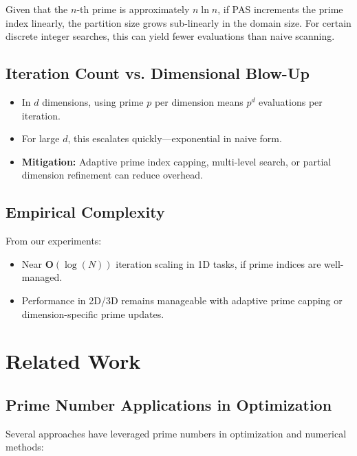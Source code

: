 \documentclass[10pt,twocolumn,letterpaper]{article}
\begin{document}
Given that the $n$-th prime is approximately $n \ln n$, if PAS increments the prime index linearly, the partition size grows sub-linearly in the domain size. For certain discrete integer searches, this can yield fewer evaluations than naive scanning.

\subsection{Iteration Count vs. Dimensional Blow-Up}

\begin{itemize}
    \item In $d$ dimensions, using prime $p$ per dimension means $p^d$ evaluations per iteration.
    \item For large $d$, this escalates quickly—exponential in naive form.
    \item \textbf{Mitigation:} Adaptive prime index capping, multi-level search, or partial dimension refinement can reduce overhead.
\end{itemize}

\subsection{Empirical Complexity}

From our experiments:
\begin{itemize}
    \item Near $\mathbf{O}(\log(N))$ iteration scaling in 1D tasks, if prime indices are well-managed.
    \item Performance in 2D/3D remains manageable with adaptive prime capping or dimension-specific prime updates.
\end{itemize}

\section{Related Work}

\subsection{Prime Number Applications in Optimization}

Several approaches have leveraged prime numbers in optimization and numerical methods:
\end{document}
